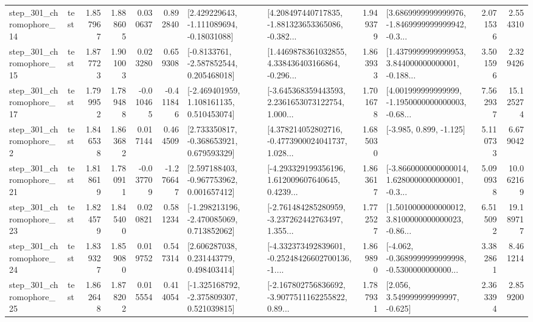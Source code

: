 \begin{tabular}{llrrrrllrlrr}
  step\_301\_chromophore\_14 &      test &      1.857967 &    1.888605 &      0.030637 &  0.892840 &    [2.429229643, -1.111089694, -0.18031088] &  [4.208497440717835, -1.881323653365086, -0.382... &       1.949379 &  [3.6869999999999976, -1.8469999999999942, -0.3... &            2.071536 &          2.554310 \\
  step\_301\_chromophore\_15 &      test &      1.877723 &    1.901003 &      0.023280 &  0.659308 &     [-0.8133761, -2.587852544, 0.205468018] &  [1.4469878361032855, 4.338436403166864, -0.296... &       1.863933 &  [1.4379999999999953, 3.844000000000001, -0.188... &            3.501596 &          2.329426 \\
  step\_301\_chromophore\_17 &      test &      1.799952 &    1.789488 &     -0.010465 & -0.411846 &    [-2.469401959, 1.108161135, 0.510453074] &  [-3.645368359443593, 2.2361653073122754, 1.000... &       1.701678 &  [4.001999999999999, -1.1950000000000003, -0.68... &            7.562937 &         15.125274 \\
   step\_301\_chromophore\_2 &      test &      1.846538 &    1.863682 &      0.017144 &  0.464509 &    [2.733350817, -0.368653921, 0.679593329] &  [4.378214052802716, -0.4773900024041737, 1.028... &       1.685030 &                            [-3.985, 0.899, -1.125] &            5.110733 &          6.679042 \\
  step\_301\_chromophore\_21 &      test &      1.818619 &    1.780911 &     -0.037709 & -1.276647 &    [2.597188403, -0.967753962, 0.001657412] &  [-4.293329199356196, 1.612009607640645, 0.4239... &       1.863617 &  [-3.8660000000000014, 1.6280000000000001, -0.3... &            5.090938 &         10.062169 \\
  step\_301\_chromophore\_23 &      test &      1.824579 &    1.845400 &      0.020821 &  0.581234 &   [-1.298213196, -2.470085069, 0.713852062] &  [-2.761484285280959, -3.237262442763497, 1.355... &       1.772527 &  [1.5010000000000012, 3.8100000000000023, -0.86... &            6.515092 &         19.189717 \\
  step\_301\_chromophore\_24 &      test &      1.839327 &    1.859080 &      0.019752 &  0.547314 &     [2.606287038, 0.231443779, 0.498403414] &  [-4.332373492839601, -0.25248426602700136, -1.... &       1.869890 &  [-4.062, -0.3689999999999998, -0.5300000000000... &            3.382861 &          8.461214 \\
  step\_301\_chromophore\_25 &      test &      1.862648 &    1.878202 &      0.015554 &  0.414054 &   [-1.325168792, -2.375809307, 0.521039815] &  [-2.167802756836692, -3.9077511162255822, 0.89... &       1.787931 &                 [2.056, 3.549999999999997, -0.625] &            2.363394 &          2.859200 \\

\end{tabular}
